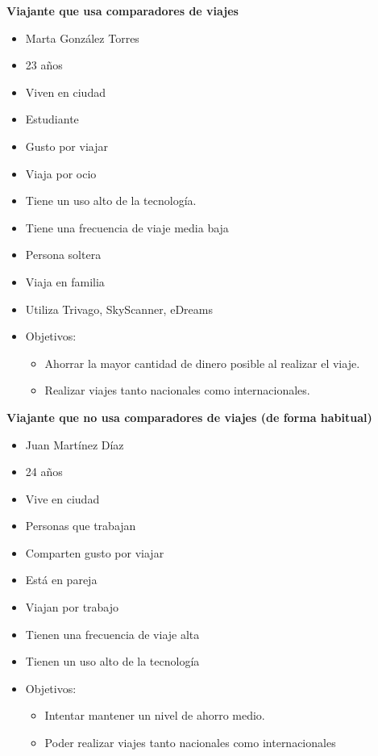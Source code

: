 \noindent \textbf{Viajante que usa comparadores de viajes}
\begin{itemize}
    \item Marta González Torres
    \item 23 años
    \item Viven en ciudad
    \item Estudiante
    \item Gusto por viajar
    \item Viaja por ocio
    \item Tiene un uso alto de la tecnología.
    \item Tiene una frecuencia de viaje media baja
    \item Persona soltera
    \item Viaja en familia
    \item Utiliza Trivago, SkyScanner, eDreams 
    \item Objetivos:
    \begin{itemize}
        \item Ahorrar la mayor cantidad de dinero posible al realizar el viaje.
        \item Realizar viajes tanto nacionales como internacionales.
    \end{itemize}         
\end{itemize}

\noindent \textbf{Viajante que no usa comparadores de viajes (de forma habitual)}
\begin{itemize}
    \item Juan Martínez Díaz
    \item 24 años
    \item Vive en ciudad
    \item Personas que trabajan
    \item Comparten gusto por viajar
    \item Está en pareja
    \item Viajan por trabajo
    \item Tienen una frecuencia de viaje alta
    \item Tienen un uso alto de la tecnología 
    \item Objetivos:
    \begin{itemize}
        \item Intentar mantener un nivel de ahorro medio.
        \item Poder realizar viajes tanto nacionales como internacionales
    \end{itemize}                      
\end{itemize}

